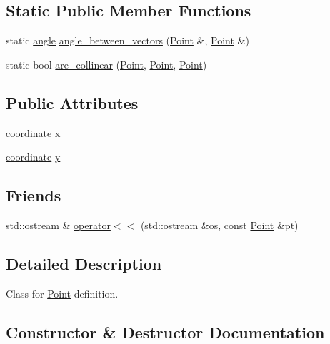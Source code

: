 \subsection*{Static Public Member Functions}
\begin{DoxyCompactItemize}
\item 
static \mbox{\hyperlink{primitives_8h_a41ee332ff1a31807cb838b616c186dd7}{angle}} \mbox{\hyperlink{class_point_a188e0a4a3b9df9e76c749f2139ad0611}{angle\+\_\+between\+\_\+vectors}} (\mbox{\hyperlink{class_point}{Point}} \&, \mbox{\hyperlink{class_point}{Point}} \&)
\item 
static bool \mbox{\hyperlink{class_point_a42bd18d21ff628166cc827871f7df960}{are\+\_\+collinear}} (\mbox{\hyperlink{class_point}{Point}}, \mbox{\hyperlink{class_point}{Point}}, \mbox{\hyperlink{class_point}{Point}})
\end{DoxyCompactItemize}
\subsection*{Public Attributes}
\begin{DoxyCompactItemize}
\item 
\mbox{\hyperlink{primitives_8h_a9949b5198385a93773b854932cb22e08}{coordinate}} \mbox{\hyperlink{class_point_a2e5bf2da8d7f35ef2ca707ae5ec1929b}{x}}
\item 
\mbox{\hyperlink{primitives_8h_a9949b5198385a93773b854932cb22e08}{coordinate}} \mbox{\hyperlink{class_point_a4390d37c7ed19ad07212fc84df2fe26e}{y}}
\end{DoxyCompactItemize}
\subsection*{Friends}
\begin{DoxyCompactItemize}
\item 
std\+::ostream \& \mbox{\hyperlink{class_point_a2c120859855730a5ff9d2eaee48471c5}{operator$<$$<$}} (std\+::ostream \&os, const \mbox{\hyperlink{class_point}{Point}} \&pt)
\end{DoxyCompactItemize}


\subsection{Detailed Description}
Class for \mbox{\hyperlink{class_point}{Point}} definition. 

\subsection{Constructor \& Destructor Documentation}
\mbox{\label{class_point_ad92f2337b839a94ce97dcdb439b4325a}} 
